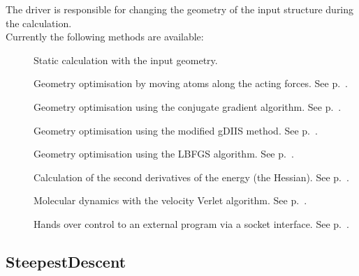 The driver is responsible for changing the geometry of the input
structure during the calculation.\\ \bigskip Currently the following
methods are available:
\begin{description}
\item[\iscb{}] Static calculation with the input geometry.
\item[] Geometry optimisation by moving atoms
  along the acting forces. See p.~.
\item[] Geometry optimisation using the
  conjugate gradient algorithm. See p.~.
\item[] Geometry optimisation using the modified gDIIS
  method. See p.~.
\item[] Geometry optimisation using the LBFGS
  algorithm. See p.~.
\item[] Calculation of the second derivatives of the
  energy (the Hessian). See p.~.
\item[] Molecular dynamics with the velocity
  Verlet algorithm. See p.~.
\item[] Hands over control to an external program via a socket
  interface. See p.~.
\end{description}


\subsection{SteepestDescent\cb}
\label{sec:dftbp.SteepestDescent}

